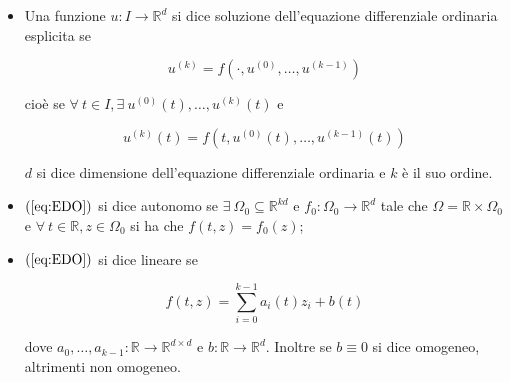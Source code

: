 \documentclass[hidelinks, 10pt]{report}
\begin{document}
\begin{itemize}
\item Una funzione $ u: I \to \mathbb{R}^{d} $ si dice soluzione dell'equazione differenziale ordinaria esplicita se

\[
u^{(k)} = f \left( \cdot, u^{(0)}, \dotsc, u^{(k - 1)} \right)
\]

cio\`e se $ \forall\ t \in I, \exists\ u^{(0)}(t), \dotsc, u^{(k)}(t) $ e 

\begin{equation}	\label{eq:EDO}
u^{(k)}(t) = f \left( t, u^{(0)}(t), \dotsc, u^{(k - 1)}(t) \right)
\end{equation}

$ d $ si dice dimensione dell'equazione differenziale ordinaria e $ k $ \`e il suo ordine.

\item $ (\ref{eq:EDO}) $ si dice autonomo se $ \exists\ \Omega_{0} \subseteq \mathbb{R}^{kd} $ e $ f_{0}: \Omega_{0} \to \mathbb{R}^{d} $ tale che $ \Omega = \mathbb{R} \times \Omega_{0} $ e $ \forall\ t \in \mathbb{R}, z \in \Omega_{0} $ si ha che $ f(t, z) = f_{0} (z) $;
\item $ (\ref{eq:EDO}) $ si dice lineare se 

\[ f(t, z) = \sum\limits_{i = 0}^{k - 1} a_{i} (t) z_{i} + b(t) \]

dove $ a_{0}, \dotsc, a_{k - 1}: \mathbb{R} \to \mathbb{R}^{d \times d} $ e $ b: \mathbb{R} \to \mathbb{R}^{d} $. Inoltre se $ b \equiv 0 $ si dice omogeneo, altrimenti non omogeneo.
\end{itemize}
\end{document}
